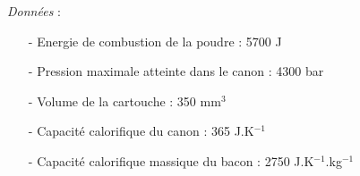 \documentclass{report}
\begin{document}
\textit{Données} : 
\begin{itemize}

	\item[-] Energie de combustion de la poudre : 5700 J
	\item[-] Pression maximale atteinte dans le canon : 4300 bar
	\item[-] Volume de la cartouche : 350 mm$^3$
	\item[-] Capacité calorifique du canon : 365 J.K$^{-1}$
	\item[-] Capacité calorifique massique du bacon : 2750 J.K$^{-1}$.kg$^{-1}$

\end{itemize}
\end{document}
